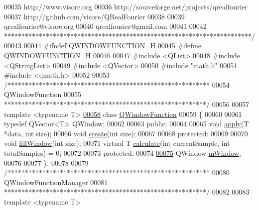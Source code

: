 \begin{DoxyCode}
00035 \textcolor{comment}{http://www.visore.org}
00036 \textcolor{comment}{http://sourceforge.net/projects/qrealfourier}
00037 \textcolor{comment}{http://github.com/visore/QRealFourier}
00038 \textcolor{comment}{}
00039 \textcolor{comment}{qrealfourier@visore.org}
00040 \textcolor{comment}{qrealfourier@gmail.com}
00041 \textcolor{comment}{}
00042 \textcolor{comment}{***********************************************************************/}
00043 
00044 \textcolor{preprocessor}{#ifndef QWINDOWFUNCTION\_H}
00045 \textcolor{preprocessor}{#define QWINDOWFUNCTION\_H}
00046 
00047 \textcolor{preprocessor}{#include <QList>}
00048 \textcolor{preprocessor}{#include <QStringList>}
00049 \textcolor{preprocessor}{#include <QVector>}
00050 \textcolor{preprocessor}{#include "math.h"}
00051 \textcolor{preprocessor}{#include <qmath.h>}
00052 
00053 \textcolor{comment}{/**********************************************************}
00054 \textcolor{comment}{QWindowFunction}
00055 \textcolor{comment}{**********************************************************/}
00056 
00057 \textcolor{keyword}{template} <\textcolor{keyword}{typename} T>
\hypertarget{a00128_source_l00058}{}\hyperlink{a00071}{00058} \textcolor{keyword}{class }\hyperlink{a00071}{QWindowFunction}
00059 \{
00060 
00061     \textcolor{keyword}{typedef} QVector<T> QWindow;
00062 
00063     \textcolor{keyword}{public}:
00064 
00065         \textcolor{keywordtype}{void} \hyperlink{a00071_aa4a4f988e1f4b65e4181a0c8c3245a00}{apply}(T *data, \textcolor{keywordtype}{int} size);
00066         \textcolor{keywordtype}{void} \hyperlink{a00071_a23ec85a35c762367195a47898cc75380}{create}(\textcolor{keywordtype}{int} size);
00067 
00068     \textcolor{keyword}{protected}:
00069 
00070         \textcolor{keywordtype}{void} \hyperlink{a00071_abde81294328ded8482380a7cfefab0b9}{fillWindow}(\textcolor{keywordtype}{int} size);
00071         \textcolor{keyword}{virtual} T \hyperlink{a00071_ad58fa8c208b487dc2cbe765053228068}{calculate}(\textcolor{keywordtype}{int} currentSample, \textcolor{keywordtype}{int} totalSamples) = 0;
00072 
00073     \textcolor{keyword}{protected}:
00074 
\hypertarget{a00128_source_l00075}{}\hyperlink{a00071_ac0e8285a38390b8388bc0be152abcb0a}{00075}         QWindow \hyperlink{a00071_ac0e8285a38390b8388bc0be152abcb0a}{mWindow};
00076 
00077 \};
00078 
00079 \textcolor{comment}{/**********************************************************}
00080 \textcolor{comment}{QWindowFunctionManager}
00081 \textcolor{comment}{**********************************************************/}
00082 
00083 \textcolor{keyword}{template} <\textcolor{keyword}{typename} T>

\end{DoxyCode}
